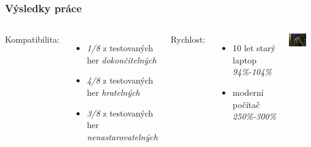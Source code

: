 
\begin{frame}
  \frametitle{Výsledky práce}
  \begin{columns}
    Kompatibilita:
    \begin{itemize}
      \item \emph{1/8} z testovaných her \emph{dokončitelných}
      \item \emph{4/8} z testovaných her \emph{hratelných}
      \item \emph{3/8} z testovaných her \emph{nenastarovatelných}
    \end{itemize}
    Rychlost:
    \begin{itemize}
      \item 10 let starý laptop \emph{94\%-104\%}
      \item moderní počítač \emph{250\%-300\%}
    \end{itemize}
    \centering
    \includegraphics[width=0.7\textwidth]{img/ff7-showcase-1-1.png}
    

\end{columns}
\end{frame}
